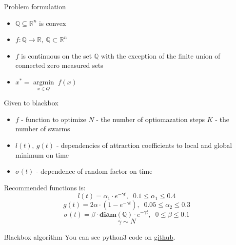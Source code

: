 \documentclass[final,hyperref]{beamer}
\newcommand{\argmin}[1]{\underset{#1}{\operatorname{argmin}}\;}
\def\mb{\mathbb}
\begin{document}
\begin{frame}[t]
\begin{columns}[t]
\begin{column}{.465\textwidth}
\begin{block}{Problem formulation}
\begin{itemize}
	\item 
		$ \mb{Q} \subseteq \mb{R}^n $ is convex
	\item
		$ f: \mb{Q} \to \mb{R}, \ \mb{Q} \subset \mb{R}^n $
	\item
		$f$ is continuous on the set $\mb{Q}$ with the exception of the finite union of connected zero measured sets
	\item
		$ x^* = \argmin{x \in Q} f(x)$

\end{itemize}

\end{block}


\begin{block}{Given to blackbox}


\begin{itemize}
	\item 
		$f$ - function to optimize
		$N$ - the number of optiomazation steps
		$K$ - the number of swarms
	\item
		$l(t),\ g(t)$ - dependencies of attraction coefficients to local 
		and global minimum on time 
	\item
		$\sigma(t)$ - dependence of random factor on time 
\end{itemize}

Recommended functions is: 
$$ l(t) = \alpha_1 \cdot e^{-\gamma t},       \; \; 0.1 \leq \alpha_1 \leq 0.4 $$
$$ g(t) = 2 \alpha \cdot (1 - e^{-\gamma t}),   \; \; 0.05 \leq \alpha_2 \leq 0.3 $$
$$ \sigma(t) = \beta \cdot \mathbf{diam}(\mb{Q}) \cdot e^{-\gamma t},  \; \;  0 \leq \beta \leq 0.1   $$
$$ \gamma \sim N $$

\end{block}




\begin{block}{Blackbox algorithm}
You can see python3 code on \href{https://github.com/Avi2011class/Artificial-bee-colony/blob/master/modules/ABC.py}{github}.

\begin{algorithm}[H]


\end{algorithm}
\end{block}
\end{column}
\end{columns}
\end{frame}
\end{document}
